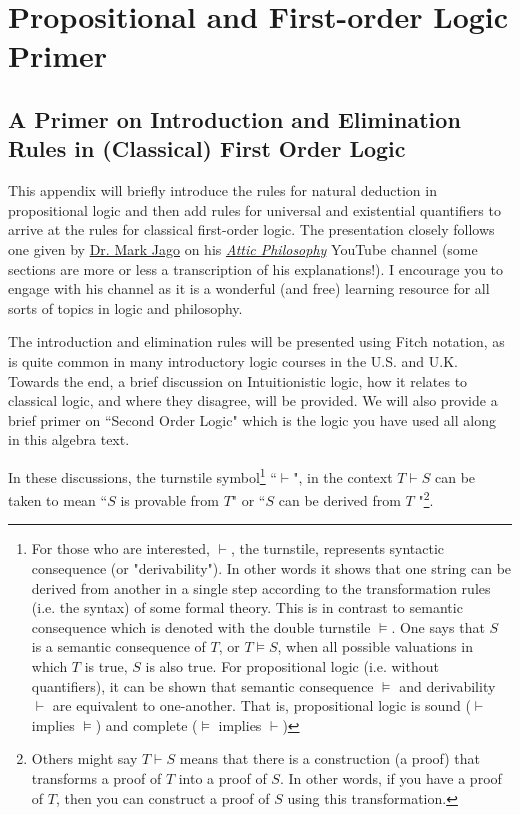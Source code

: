 \chapter*{Propositional and First-order Logic Primer}
\addtocounter{chapter}{1} %

\section*{A Primer on Introduction and Elimination Rules in (Classical) First Order Logic}

This appendix will briefly introduce the rules for natural deduction in propositional logic and then add rules for universal and existential quantifiers to arrive at the rules for classical first-order logic. The presentation closely follows one given by \href{https://markjago.net/}{Dr. Mark Jago} on his \href{https://www.youtube.com/@AtticPhilosophy}{\textit{Attic Philosophy}} YouTube channel (some sections are more or less a transcription of his explanations!). I encourage you to engage with his channel as it is a wonderful (and free) learning resource for all sorts of topics in logic and philosophy. 

The introduction and elimination rules will be presented using Fitch notation, as is quite common in many introductory logic courses in the U.S. and U.K. Towards the end, a brief discussion on Intuitionistic logic, how it relates to classical logic, and where they disagree, will be provided. We will also provide a brief primer on ``Second Order Logic" which is the logic you have used all along in this algebra text.

In these discussions, the turnstile symbol\footnote{For those who are interested, $\vdash$, the turnstile, represents syntactic consequence (or "derivability"). In other words it shows that one string can be derived from another in a single step according to the transformation rules (i.e. the syntax) of some formal theory. This is in contrast to semantic consequence which is denoted with the double turnstile $\vDash$. One says that $S$ is a semantic consequence of $T$, or $T\vDash S$, when all possible valuations in which $T$ is true, $S$ is also true. For propositional logic (i.e. without quantifiers), it can be shown that semantic consequence $\vDash$ and derivability $\vdash$ are equivalent to one-another. That is, propositional logic is sound ($\vdash$ implies $\vDash$) and complete ($\vDash$ implies $\vdash$)} ``$\vdash$", in the context $T \vdash S$ can be taken to mean ``$S$ is provable from $T$" or ``$S$ can be derived from $T$ "\footnote{Others might say $T\vdash S$ means that there is a construction (a proof) that transforms a proof of $T$ into a proof of $S$. In other words, if you have a proof of $T$, then you can construct a proof of $S$ using this transformation.}.

